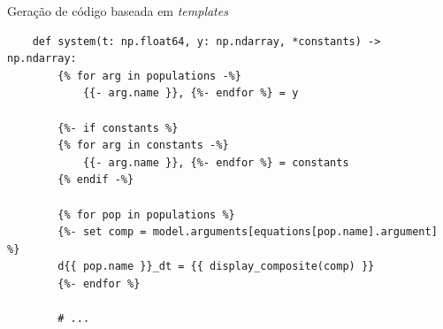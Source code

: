 \begin{frame}[fragile]{Geração de código baseada em \textit{templates}}
    \begin{verbatim}
    def system(t: np.float64, y: np.ndarray, *constants) -> np.ndarray:
        {% for arg in populations -%}
            {{- arg.name }}, {%- endfor %} = y

        {%- if constants %}
        {% for arg in constants -%}
            {{- arg.name }}, {%- endfor %} = constants
        {% endif -%}

        {% for pop in populations %}
        {%- set comp = model.arguments[equations[pop.name].argument] %}
        d{{ pop.name }}_dt = {{ display_composite(comp) }}
        {%- endfor %}

        # ...
    \end{verbatim}
\end{frame}

